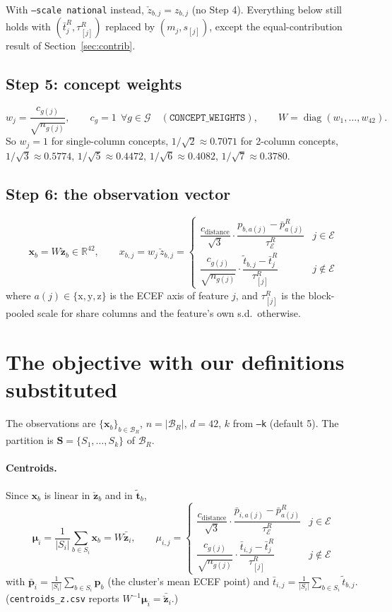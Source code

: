 \documentclass[11pt]{article}
\newcommand{\R}{\mathbb{R}}
\newcommand{\x}{\mathbf{x}}
\newcommand{\bmu}{\boldsymbol{\mu}}
\begin{document}
With \texttt{--scale national} instead, $\check z_{b,j}=z_{b,j}$ (no Step 4). Everything below
still holds with $(\bar t^R_j,\tau^R_{[j]})$ replaced by $(m_j,s_{[j]})$, except the
equal-contribution result of Section~\ref{sec:contrib}.

\subsection{Step 5: concept weights}

\[
w_j=\frac{c_{g(j)}}{\sqrt{n_{g(j)}}},\qquad c_g=1\ \ \forall g\in\mathcal G
\quad(\texttt{CONCEPT\_WEIGHTS}),\qquad
W=\operatorname{diag}(w_1,\dots,w_{42}).
\]
So $w_j=1$ for single-column concepts, $1/\sqrt2\approx0.7071$ for 2-column concepts,
$1/\sqrt3\approx0.5774$, $1/\sqrt5\approx0.4472$, $1/\sqrt6\approx0.4082$,
$1/\sqrt7\approx0.3780$.

\subsection{Step 6: the observation vector}

\[
\boxed{\;\x_b=W\check{\mathbf z}_b\in\R^{42},\qquad
x_{b,j}=w_j\,\check z_{b,j}=
\begin{cases}
\dfrac{c_{\text{distance}}}{\sqrt3}\cdot\dfrac{p_{b,a(j)}-\bar p^R_{a(j)}}{\tau^R_{\mathcal E}} & j\in\mathcal E\\[12pt]
\dfrac{c_{g(j)}}{\sqrt{n_{g(j)}}}\cdot\dfrac{\tilde t_{b,j}-\bar t^R_j}{\tau^R_{[j]}} & j\notin\mathcal E
\end{cases}\;}
\]
where $a(j)\in\{\mathrm x,\mathrm y,\mathrm z\}$ is the ECEF axis of feature $j$, and
$\tau^R_{[j]}$ is the block-pooled scale for share columns and the feature's own s.d.\
otherwise.

\section{The objective with our definitions substituted}

The observations are $\{\x_b\}_{b\in\mathcal B_R}$, $n=|\mathcal B_R|$, $d=42$, $k$ from
\texttt{--k} (default 5). The partition is $\mathbf S=\{S_1,\dots,S_k\}$ of $\mathcal B_R$.

\paragraph{Centroids.} Since $\x_b$ is linear in $\check{\mathbf z}_b$ and in $\tilde{\mathbf t}_b$,
\[
\bmu_i=\frac1{|S_i|}\sum_{b\in S_i}\x_b=W\bar{\check{\mathbf z}}_{i},\qquad
\mu_{i,j}=\begin{cases}
\dfrac{c_{\text{distance}}}{\sqrt3}\cdot\dfrac{\bar p_{i,a(j)}-\bar p^R_{a(j)}}{\tau^R_{\mathcal E}} & j\in\mathcal E\\[12pt]
\dfrac{c_{g(j)}}{\sqrt{n_{g(j)}}}\cdot\dfrac{\bar t_{i,j}-\bar t^R_j}{\tau^R_{[j]}} & j\notin\mathcal E
\end{cases}
\]
with $\bar{\mathbf p}_i=\frac1{|S_i|}\sum_{b\in S_i}\mathbf p_b$ (the cluster's mean ECEF point)
and $\bar t_{i,j}=\frac1{|S_i|}\sum_{b\in S_i}\tilde t_{b,j}$.
(\texttt{centroids\_z.csv} reports $W^{-1}\bmu_i=\bar{\check{\mathbf z}}_i$.)
\end{document}

